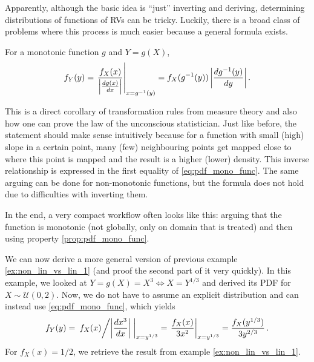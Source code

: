 Apparently, although the basic idea is \enquote{just} inverting and deriving, determining distributions of functions of RVs can be tricky. Luckily, there is a broad class of problems where this process is much easier because a general formula exists.
\begin{prop}\label{prop:pdf_mono_func}
For a monotonic function $g$ and $Y = g(X)$,
\begin{equation}\label{eq:pdf_mono_func}
f_Y(y) = \eval{\frac{f_X(x)}{\abs{\dv{g(x)}{x}}}}_{x = g^{-1}(y)} = f_X(g^{-1}(y)) \, \abs{\dv{g^{-1}(y)}{y}} \, .
\end{equation}
\end{prop}
This is a direct corollary of transformation rules from measure theory and also how one can prove the law of the unconscious statistician. Just like before, the statement should make sense intuitively because for a function with small (high) slope in a certain point, many (few) neighbouring points get mapped close to where this point is mapped and the result is a higher (lower) density. This inverse relationship is expressed in the first equality of \eqref{eq:pdf_mono_func}. The same arguing can be done for non-monotonic functions, but the formula does not hold due to difficulties with inverting them.

In the end, a very compact workflow often looks like this: arguing that the function is monotonic (not globally, only on domain that is treated) and then using property \ref{prop:pdf_mono_func}.\\



\begin{ex}
We can now derive a more general version of previous example \ref{ex:non_lin_vs_lin_1} (and proof the second part of it very quickly). In this example, we looked at $Y = g(X) = X^3 \Leftrightarrow X = Y^{1 / 3}$ and derived its PDF for $X \sim \mathcal{U}(0, 2)$. Now, we do not have to assume an explicit distribution and can instead use \eqref{eq:pdf_mono_func}, which yields
\begin{equation*}
f_Y(y) = \eval{\flatfrac{f_X(x)}{\abs{\dv{x^3}{x}}}}_{x = y^{1 / 3}} = \eval{\frac{f_X(x)}{3 x^2}}_{x = y^{1 / 3}} = \frac{f_X(y^{1 / 3})}{3 y^{2 / 3}} \, .
\end{equation*}
For $f_X(x) = 1 / 2$, we retrieve the result from example \ref{ex:non_lin_vs_lin_1}.
\end{ex}



